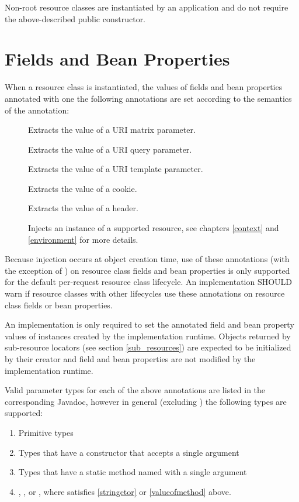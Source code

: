 Non-root resource classes are instantiated by an application and do not require the above-described public constructor.

\section{Fields and Bean Properties}
\label{resource_field}

When a resource class is instantiated, the values of fields and bean properties annotated with one the following annotations are set according to the semantics of the annotation:

\begin{description}
\item[\MatrixParam] Extracts the value of a URI matrix parameter.
\item[\QueryParam] Extracts the value of a URI query parameter.
\item[\PathParam] Extracts the value of a URI template parameter.
\item[\CookieParam] Extracts the value of a cookie.
\item[\HeaderParam] Extracts the value of a header.
\item[\Context] Injects an instance of a supported resource, see chapters \ref{context} and \ref{environment} for more details.
\end{description}

Because injection occurs at object creation time, use of these annotations (with the exception of \Context) on resource class fields and bean properties is only supported for the default per-request resource class lifecycle. An implementation SHOULD warn if resource classes with other lifecycles use these annotations on resource class fields or bean properties.

An implementation is only required to set the annotated field and bean property values of instances created by the implementation runtime. Objects returned by sub-resource locators (see section \ref{sub_resources}) are expected to be initialized by their creator and field and bean properties are not modified by the implementation runtime.

Valid parameter types for each of the above annotations are listed in the corresponding Javadoc, however in general (excluding \Context) the following types are supported:

\begin{enumerate}
\item Primitive types
\item\label{stringctor} Types that have a constructor that accepts a single  argument
\item\label{valueofmethod} Types that have a static method named  with a single  argument
\item {}, , or , where  satisfies \ref{stringctor} or \ref{valueofmethod} above.
\end{enumerate}

